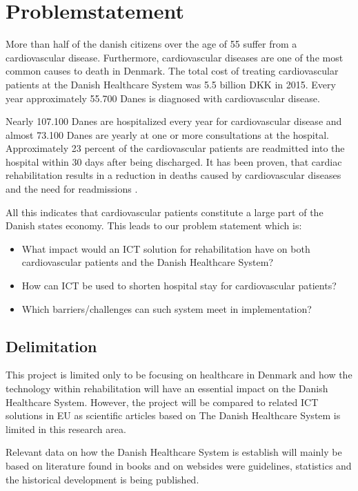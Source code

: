 \section{Problemstatement}
More than half of the danish citizens over the age of 55 suffer from a cardiovascular disease. Furthermore, cardiovascular diseases are one of the most common causes to death in Denmark. The total cost of treating cardiovascular patients at the Danish Healthcare System was 5.5 billion DKK in 2015. Every year approximately 55.700 Danes is diagnosed with cardiovascular disease.   

Nearly 107.100 Danes are hospitalized every year for cardiovascular disease and almost 73.100 Danes are yearly at one or more consultations at the hospital. Approximately 23 percent of the cardiovascular patients are readmitted into the hospital within 30 days after being discharged. It has been proven, that cardiac rehabilitation results in a reduction in deaths caused by cardiovascular diseases and the need for readmissions \cite{Hjerteforening}.

All this indicates that cardiovascular patients constitute a large part of the Danish states economy. This leads to our problem statement which is:

\begin{itemize}
	\item What impact would an ICT solution for rehabilitation have on both cardiovascular patients and the Danish Healthcare System?
	\item How can ICT be used to shorten hospital stay for cardiovascular patients?
	\item Which barriers/challenges can such system meet in implementation?
\end{itemize}

\subsection{Delimitation}
This project is limited only to be focusing on healthcare in Denmark and how the technology within rehabilitation will have an essential impact on the Danish Healthcare System. However, the project will be compared to related ICT solutions in EU as scientific articles based on The Danish Healthcare System is limited in this research area. 

Relevant data on how the Danish Healthcare System is establish will mainly be based on literature found in books and on websides were guidelines, statistics and the historical development is being published. 


